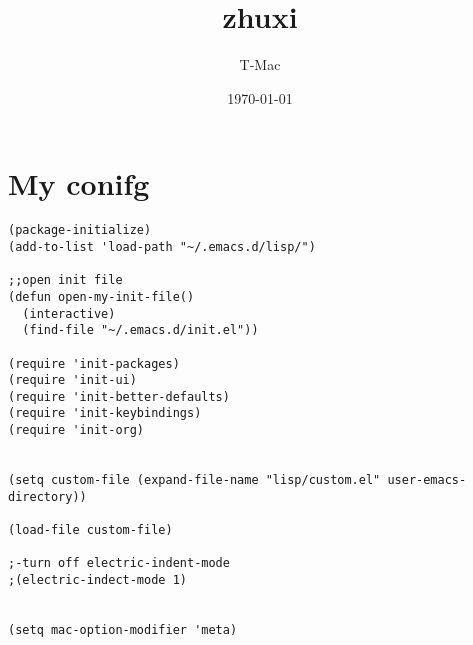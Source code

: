 \documentclass[11pt]{article}
\author{T-Mac}
\date{\today}
\title{zhuxi}
\begin{document}
\maketitle
\tableofcontents

\section{My conifg}
\label{sec-1}
\begin{verbatim}
(package-initialize)
(add-to-list 'load-path "~/.emacs.d/lisp/")

;;open init file
(defun open-my-init-file()
  (interactive)
  (find-file "~/.emacs.d/init.el"))

(require 'init-packages)
(require 'init-ui)
(require 'init-better-defaults)
(require 'init-keybindings)
(require 'init-org)


(setq custom-file (expand-file-name "lisp/custom.el" user-emacs-directory))

(load-file custom-file)

;-turn off electric-indent-mode
;(electric-indect-mode 1)


(setq mac-option-modifier 'meta)
\end{verbatim}
\end{document}

